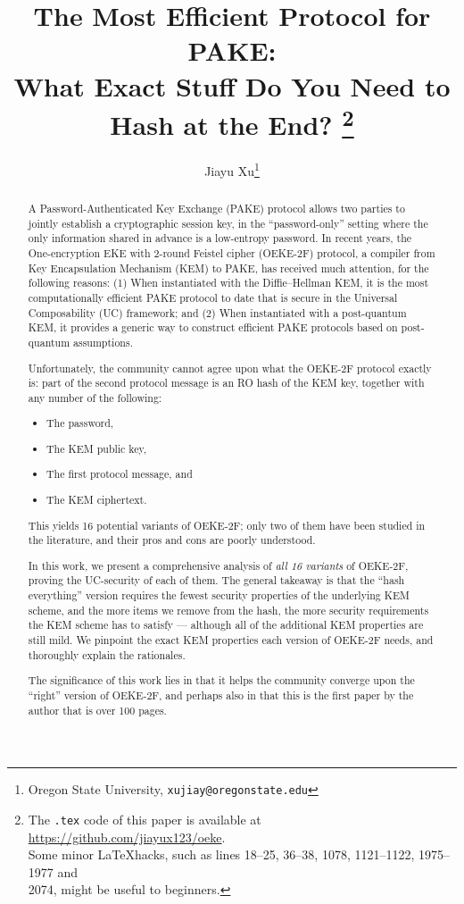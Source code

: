 \documentclass{article}
\theoremstyle{plain}
\theoremstyle{definition}
\theoremstyle{remark}
\begin{document}
\title{The Most Efficient Protocol for PAKE: \\
\medskip
\large{What Exact Stuff Do You Need to Hash at the End?}
\thanks{The \texttt{.tex} code of this paper is available at \url{https://github.com/jiayux123/oeke}. \\ Some minor \LaTeX\;hacks, such as lines 18--25, 36--38, 1078, 1121--1122, 1975--1977 and \\ 2074, might be useful to beginners.}
}

\author{Jiayu Xu\footnote{Oregon State University, \texttt{xujiay@oregonstate.edu}}}
\date{}

\maketitle
\begin{abstract}
A Password-Authenticated Key Exchange (PAKE) protocol allows two parties to jointly establish a cryptographic session key, in the ``password-only'' setting where the only information shared in advance is a low-entropy password. In recent years, the One-encryption EKE with 2-round Feistel cipher (OEKE-2F) protocol, a compiler from Key Encapsulation Mechanism (KEM) to PAKE, has received much attention, for the following reasons: (1) When instantiated with the Diffie--Hellman KEM, it is the most computationally efficient PAKE protocol to date that is secure in the Universal Composability (UC) framework; and (2) When instantiated with a post-quantum KEM, it provides a generic way to construct efficient PAKE protocols based on post-quantum assumptions.

Unfortunately, the community cannot agree upon what the OEKE-2F protocol exactly is: part of the second protocol message is an RO hash of the KEM key, together with any number of the following:
\begin{itemize}
  \item The password,
  \item The KEM public key,
  \item The first protocol message, and
  \item The KEM ciphertext.
\end{itemize}
This yields 16 potential variants of OEKE-2F; only two of them have been studied in the literature, and their pros and cons are poorly understood.

In this work, we present a comprehensive analysis of \emph{all 16 variants} of OEKE-2F, proving the UC-security of each of them. The general takeaway is that the ``hash everything'' version requires the fewest security properties of the underlying KEM scheme, and the more items we remove from the hash, the more security requirements the KEM scheme has to satisfy --- although all of the additional KEM properties are still mild. We pinpoint the exact KEM properties each version of OEKE-2F needs, and thoroughly explain the rationales.

The significance of this work lies in that it helps the community converge upon the ``right'' version of OEKE-2F, and perhaps also in that this is the first paper by the author that is over 100 pages.
\end{abstract}
\end{document}

